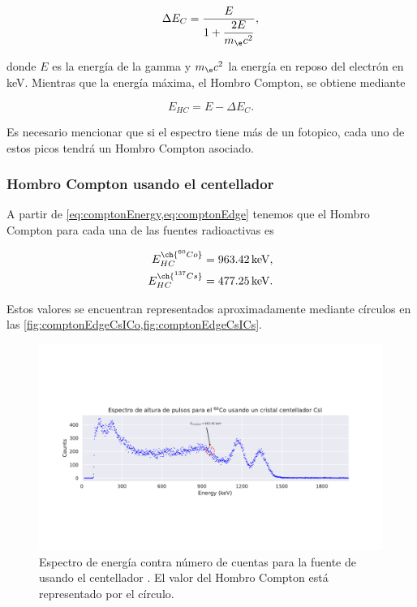 \documentclass[12pt]{article}
\begin{document}
    \begin{equation}
        \Delta E_{C} = \dfrac{E}{1 + \dfrac{2E}{m_{\e}c^{2}}},
        \label{eq:comptonEnergy}
    \end{equation}

    donde \(E\) es la energía de la gamma y \(m_{\e}c^{2}\) la energía en reposo del electrón en \unit{\keV}. Mientras que la energía máxima, el Hombro Compton, se obtiene mediante

    \begin{equation}
        E_{HC} = E - \Delta E_{C}.
        \label{eq:comptonEdge}
    \end{equation}

    Es necesario mencionar que si el espectro tiene más de un fotopico, cada uno de estos picos tendrá un Hombro Compton asociado.

    \subsubsection*{Hombro Compton usando el centellador }

    A partir de \cref{eq:comptonEnergy,eq:comptonEdge} tenemos que el Hombro Compton para cada una de las fuentes radioactivas es

    \begin{align*}
        E_{HC}^{\ch{^{60} Co}} &= \qty{963.42}{\keV},\\
        E_{HC}^{\ch{^{137} Cs}} &= \qty{477.25}{\keV}.
    \end{align*}

    Estos valores se encuentran representados aproximadamente mediante círculos en las \cref{fig:comptonEdgeCsICo,fig:comptonEdgeCsICs}.

    \begin{figure}[!htb]
        \centering
        \includegraphics[trim={1cm 3.75cm 1cm 3.75cm}, width=\textwidth, clip]{compton_edge_CsICo.pdf}
        \caption{Espectro de energía contra número de cuentas para la fuente de  usando el centellador . El valor del Hombro Compton está representado por el círculo.}
        \label{fig:comptonEdgeCsICo}
    \end{figure}
\end{document}
